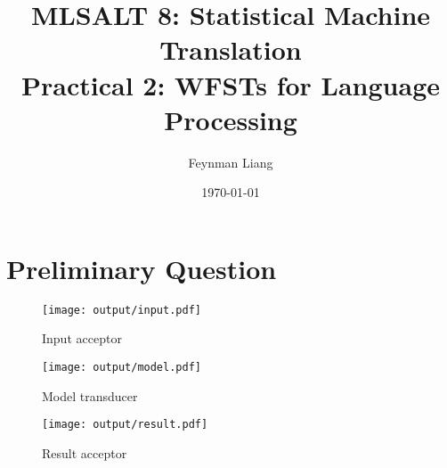 \documentclass[a4paper,oneside,reqno]{amsart}
\newcommand{\authorname}{Feynman Liang}
\newcommand{\coursename}{MLSALT 8: Statistical Machine Translation}
\newcommand{\assignmentname}{Practical 2: WFSTs for Language Processing}
\begin{document}
\title{\coursename\\\assignmentname}

\author{\authorname}
\date{\today}

\maketitle

\section{Preliminary Question}

\begin{figure}[ht!]
  \begin{center}
    \texttt{[image: output/input.pdf]}
  \end{center}
  \caption{Input acceptor}
\end{figure}

\begin{figure}[ht!]
  \begin{center}
    \texttt{[image: output/model.pdf]}
  \end{center}
  \caption{Model transducer}
  \label{fig:prelim-model}
\end{figure}

\begin{figure}[ht!]
  \begin{center}
    \texttt{[image: output/result.pdf]}
  \end{center}
  \caption{Result acceptor}
\end{figure}
\end{document}
